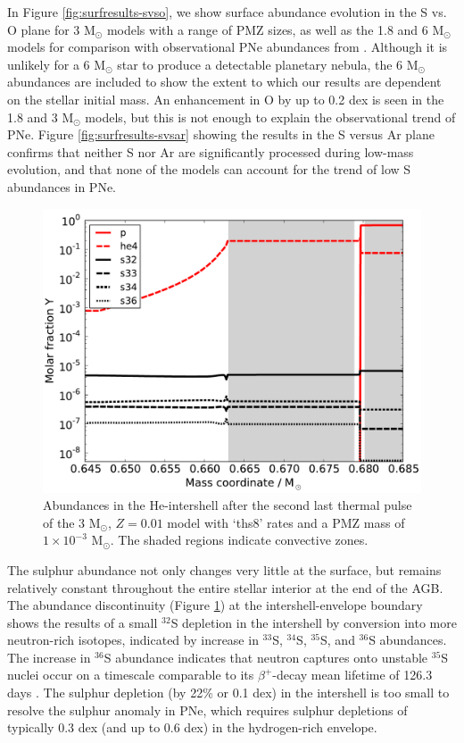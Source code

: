 In Figure \ref{fig:surfresults-svso}, we show surface abundance evolution in the S vs. O plane for 3 M$_\odot$ models with a range of PMZ sizes, as well as the 1.8 and 6 M$_\odot$ models for comparison with observational PNe abundances from \citet{Pottasch:2010jt}. Although it is unlikely for a 6 M$_\odot$ star to produce a detectable planetary nebula, the 6 M$_\odot$ abundances are included to show the extent to which our results are dependent on the stellar initial mass. An enhancement in O by up to 0.2 dex is seen in the 1.8 and 3 M$_\odot$ models, but this is not enough to explain the observational trend of PNe. Figure \ref{fig:surfresults-svsar} showing the results in the S versus Ar plane confirms that neither S nor Ar are significantly processed during low-mass evolution, and that none of the models can account for the trend of low S abundances in PNe.

\begin{figure}
 \begin{center}\includegraphics[width=\columnwidth]{figures/m3z01-ths8pmz1-0073610.pdf}\end{center}
 \caption{Abundances in the He-intershell after the second last thermal pulse of the 3 M$_\odot$, $Z=0.01$ model with `ths8' rates and a PMZ mass of $1\times10^{-3}$ M$_\odot$. The shaded regions indicate convective zones.}\label{fig:composition}
\end{figure}

The sulphur abundance not only changes very little at the surface, but remains relatively constant throughout the entire stellar interior at the end of the AGB. The abundance discontinuity (Figure \ref{fig:composition}) at the intershell-envelope boundary shows the results of a small $^{32}$S depletion in the intershell by conversion into more neutron-rich isotopes, indicated by increase in $^{33}$S, $^{34}$S, $^{35}$S, and $^{36}$S abundances. The increase in $^{36}$S abundance indicates that neutron captures onto unstable $^{35}$S nuclei occur on a timescale comparable to its $\beta^+$-decay mean lifetime of 126.3 days \citep{Audi:2003id}. The sulphur depletion (by 22\% or 0.1 dex) in the intershell is too small to resolve the sulphur anomaly in PNe, which requires sulphur depletions of typically 0.3 dex (and up to 0.6 dex) in the hydrogen-rich envelope.

